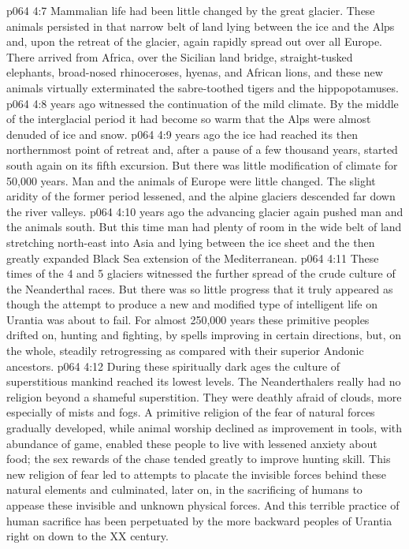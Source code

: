 \vs p064 4:7 Mammalian life had been little changed by the great glacier. These animals persisted in that narrow belt of land lying between the ice and the Alps and, upon the retreat of the glacier, again rapidly spread out over all Europe. There arrived from Africa, over the Sicilian land bridge, straight\hyp{}tusked elephants, broad\hyp{}nosed rhinoceroses, hyenas, and African lions, and these new animals virtually exterminated the sabre\hyp{}toothed tigers and the hippopotamuses.
\vs p064 4:8 \pc {} years ago witnessed the continuation of the mild climate. By the middle of the interglacial period it had become so warm that the Alps were almost denuded of ice and snow.
\vs p064 4:9 \pc {} years ago the ice had reached its then northernmost point of retreat and, after a pause of a few thousand years, started south again on its fifth excursion. But there was little modification of climate for 50,000 years. Man and the animals of Europe were little changed. The slight aridity of the former period lessened, and the alpine glaciers descended far down the river valleys.
\vs p064 4:10 \pc {} years ago the advancing glacier again pushed man and the animals south. But this time man had plenty of room in the wide belt of land stretching north\hyp{}east into Asia and lying between the ice sheet and the then greatly expanded Black Sea extension of the Mediterranean.
\vs p064 4:11 These times of the 4 and 5 glaciers witnessed the further spread of the crude culture of the Neanderthal races. But there was so little progress that it truly appeared as though the attempt to produce a new and modified type of intelligent life on Urantia was about to fail. For almost 250,000 years these primitive peoples drifted on, hunting and fighting, by spells improving in certain directions, but, on the whole, steadily retrogressing as compared with their superior Andonic ancestors.
\vs p064 4:12 \pc During these spiritually dark ages the culture of superstitious mankind reached its lowest levels. The Neanderthalers really had no religion beyond a shameful superstition. They were deathly afraid of clouds, more especially of mists and fogs. A primitive religion of the fear of natural forces gradually developed, while animal worship declined as improvement in tools, with abundance of game, enabled these people to live with lessened anxiety about food; the sex rewards of the chase tended greatly to improve hunting skill. This new religion of fear led to attempts to placate the invisible forces behind these natural elements and culminated, later on, in the sacrificing of humans to appease these invisible and unknown physical forces. And this terrible practice of human sacrifice has been perpetuated by the more backward peoples of Urantia right on down to the XX century.
